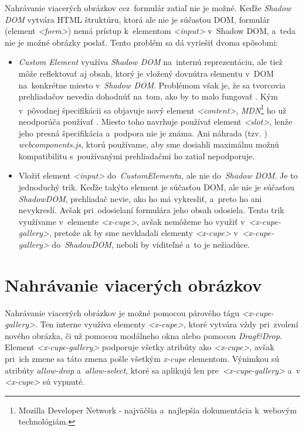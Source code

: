 Nahrávanie viacerých obrázkov cez~formulár zatiaľ nie je možné. Keďže \emph{Shadow DOM} vytvára HTML štruktúru, ktorá ale nie je súčasťou DOM, formulár (element \emph{<form>}) nemá prístup k~elementom \emph{<input>} v~Shadow DOM, a~teda nie je možné obrázky poslať. Tento problém sa dá vyriešiť dvoma spôsobmi:

\begin{itemize}
	\item \emph{Custom Element} využíva \emph{Shadow DOM} na~internú reprezentáciu, ale tiež môže reflektovať aj obsah, ktorý je vložený dovnútra elementu v~DOM na~konkrétne miesto v~\emph{Shadow DOM}. Problémom však je, že sa tvorcovia prehliadačov nevedia dohodnúť na~tom, ako by to malo fungovať \cite{WebComponents_state}. Kým v~pôvodnej špecifikácii sa objavuje nový element \emph{<content>}, \emph{MDN}\footnote{Mozilla Developer Network - najväčšia a~najlepšia dokumentácia k~webovým technológiám.} ho už neodporúča používať \cite{MDN_Content_Element}. Miesto toho navrhuje používať element \emph{<slot>}, lenže jeho presná špecifikácia a~podpora nie je známa. Ani náhrada (tzv. ) \emph{webcomponents.js}, ktorú používame, aby sme dosiahli maximálnu možnú kompatibilitu s~používanými prehliadačmi ho zatiaľ nepodporuje.
	\item Vložiť element \emph{<input>} do~\emph{CustomElement}u, ale nie do~\emph{Shadow DOM}. Je to jednoduchý trik. Keďže takýto element je súčasťou DOM, ale nie je súčasťou \emph{ShadowDOM}, prehliadač nevie, ako ho má vykresliť, a~preto ho ani nevykreslí. Avšak pri~odosielaní formulára jeho obsah odosiela. Tento trik využívame v~elemente \emph{<x-cupe>}, avšak nemôžeme ho využiť v~\emph{<x-cupe-gallery>}, pretože ak by sme nevkladali elementy \emph{<x-cupe>} v~\emph{<x-cupe-gallery>} do~\emph{ShadowDOM}, neboli by viditeľné a~to je nežiadúce.
\end{itemize}


\section{Nahrávanie viacerých obrázkov}

Nahrávanie viacerých obrázkov je možné pomocou párového tágu \emph{<x-cupe-gallery>}. Ten interne využíva elementy \emph{<x-cupe>}, ktoré vytvára vždy pri~zvolení nového obrázka, či už pomocou modálneho okna alebo pomocou \emph{Drag\&Drop}. Element \emph{<x-cupe-gallery>} podporuje všetky atribúty ako \emph{<x-cupe>}, avšak pri~ich zmene sa táto zmena pošle všetkým \emph{x-cupe} elementom. Výnimkou sú atribúty \emph{allow-drop} a~\emph{allow-select}, ktoré sa aplikujú len pre~\emph{<x-cupe-gallery>} a~v \emph{<x-cupe>} sú vypnuté.



